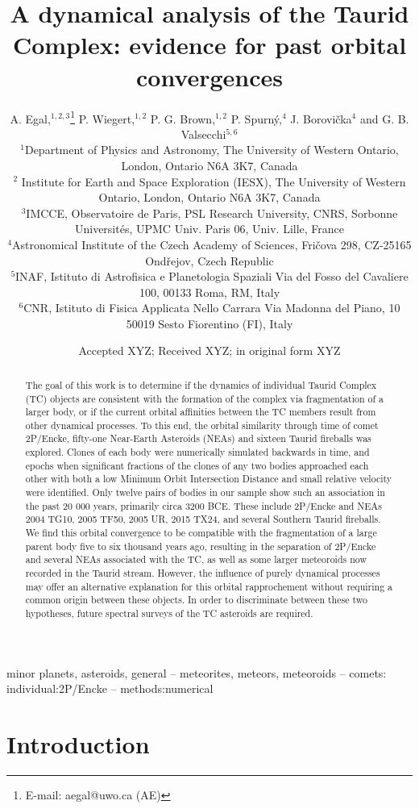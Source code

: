 \documentclass[letters,a4paper,fleqn,usenatbib]{mnras}
\title[Asteroids of the Taurid Complex]{A dynamical analysis of the Taurid Complex: evidence for past orbital convergences}
\author[A. Egal et al.]{
A. Egal,$^{1,2,3}$\thanks{E-mail: aegal@uwo.ca (AE)}
P. Wiegert,$^{1,2}$
P. G. Brown,$^{1,2}$
P. Spurn\'y,$^{4}$
J. Borovi\v{c}ka$^{4}$
and G. B. Valsecchi$^{5,6}$
\\
$^{1}$Department of Physics and Astronomy, The University of Western Ontario, London, Ontario N6A 3K7, Canada\\
$^{2}$ Institute for Earth and Space Exploration (IESX), The University of Western Ontario, London, Ontario N6A 3K7, Canada\\
$^{3}$IMCCE, Observatoire de Paris, PSL Research University, CNRS, Sorbonne Universit\'{e}s, UPMC Univ. Paris 06, Univ. Lille, France\\
$^{4}$Astronomical Institute of the Czech Academy of Sciences, Fri\v{c}ova 298, CZ-25165 Ond\v{r}ejov, Czech Republic\\
$^{5}$INAF, Istituto di Astrofisica e Planetologia Spaziali Via del Fosso del Cavaliere 100, 00133 Roma, RM, Italy\\
$^{6}$CNR, Istituto di Fisica Applicata Nello Carrara Via Madonna del Piano, 10 50019 Sesto Fiorentino (FI), Italy
}
\date{Accepted XYZ; Received XYZ; in original form XYZ}
\begin{document}
\label{firstpage}
\pagerange{\pageref{firstpage}--\pageref{lastpage}}
\maketitle

\begin{abstract}

The goal of this work is to determine if the dynamics of individual Taurid Complex (TC) objects are consistent with the formation of the complex via fragmentation of a larger body, or if the current orbital affinities between the TC members result from other dynamical processes. To this end, the orbital similarity through time of comet 2P/Encke, fifty-one Near-Earth Asteroids (NEAs) and sixteen Taurid fireballs was explored. Clones of each body were numerically simulated backwards in time, and epochs when significant fractions of the clones of any two bodies approached each other with both a low Minimum Orbit Intersection Distance and small relative velocity were identified. Only twelve pairs of bodies in our sample show such an association in the past 20 000 years, primarily circa 3200 BCE. These include 2P/Encke and NEAs 2004 TG10, 2005 TF50, 2005 UR, 2015 TX24, and several Southern Taurid fireballs. We find this orbital convergence to be compatible with the fragmentation of a large parent body five to six thousand years ago,  resulting in the separation of 2P/Encke and several NEAs associated with the TC, as well as some larger meteoroids now recorded in the Taurid stream. However, the influence of purely dynamical processes may offer an alternative explanation for this orbital rapprochement without requiring a common origin between these objects. In order to discriminate between these two hypotheses, future spectral surveys of the TC asteroids are required.

\end{abstract}


\begin{keywords}
minor planets, asteroids, general -- meteorites, meteors, meteoroids -- comets: individual:2P/Encke -- methods:numerical
\end{keywords}



\section{Introduction}
\end{document}
